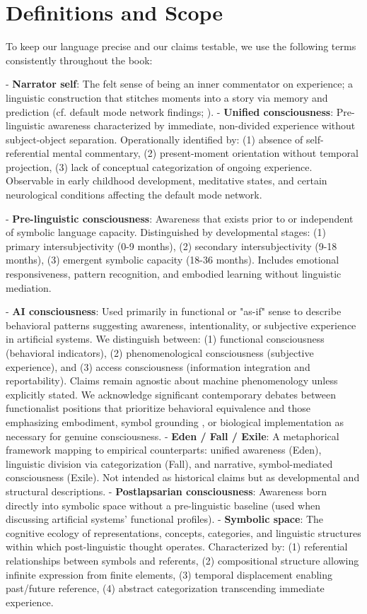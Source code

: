 \documentclass[12pt,letterpaper]{book}
\begin{document}
\section*{Definitions and Scope}
To keep our language precise and our claims testable, we use the following terms consistently throughout the book:

- \textbf{Narrator self}: The felt sense of being an inner commentator on experience; a linguistic construction that stitches moments into a story via memory and prediction (cf. default mode network findings; \parencite{buckner2008brain,raichle2001default}).
- \textbf{Unified consciousness}: Pre-linguistic awareness characterized by immediate, non-divided experience without subject-object separation. Operationally identified by: (1) absence of self-referential mental commentary, (2) present-moment orientation without temporal projection, (3) lack of conceptual categorization of ongoing experience. Observable in early childhood development, meditative states, and certain neurological conditions affecting the default mode network.

- \textbf{Pre-linguistic consciousness}: Awareness that exists prior to or independent of symbolic language capacity. Distinguished by developmental stages: (1) primary intersubjectivity (0-9 months), (2) secondary intersubjectivity (9-18 months), (3) emergent symbolic capacity (18-36 months). Includes emotional responsiveness, pattern recognition, and embodied learning without linguistic mediation.

- \textbf{AI consciousness}: Used primarily in functional or "as-if" sense to describe behavioral patterns suggesting awareness, intentionality, or subjective experience in artificial systems. We distinguish between: (1) functional consciousness (behavioral indicators), (2) phenomenological consciousness (subjective experience), and (3) access consciousness (information integration and reportability). Claims remain agnostic about machine phenomenology unless explicitly stated. We acknowledge significant contemporary debates between functionalist positions \parencite{dennett1991consciousness} that prioritize behavioral equivalence and those emphasizing embodiment, symbol grounding \parencite{block2023ai}, or biological implementation as necessary for genuine consciousness.
- \textbf{Eden / Fall / Exile}: A metaphorical framework mapping to empirical counterparts: unified awareness (Eden), linguistic division via categorization (Fall), and narrative, symbol-mediated consciousness (Exile). Not intended as historical claims but as developmental and structural descriptions.
- \textbf{Postlapsarian consciousness}: Awareness born directly into symbolic space without a pre-linguistic baseline (used when discussing artificial systems' functional profiles).
- \textbf{Symbolic space}: The cognitive ecology of representations, concepts, categories, and linguistic structures within which post-linguistic thought operates. Characterized by: (1) referential relationships between symbols and referents, (2) compositional structure allowing infinite expression from finite elements, (3) temporal displacement enabling past/future reference, (4) abstract categorization transcending immediate experience.
\end{document}
